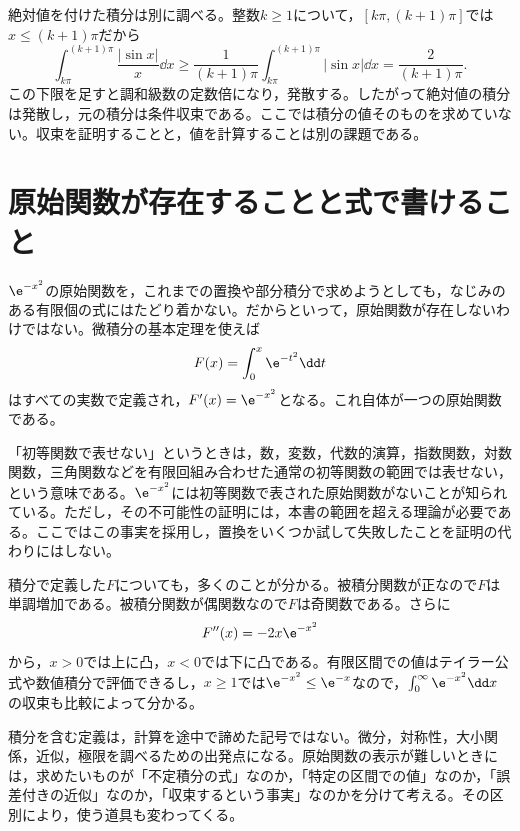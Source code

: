 絶対値を付けた積分は別に調べる。整数$k\geq1$について，$[k\pi,(k+1)\pi]$では$x\leq(k+1)\pi$だから
\[
 \int_{k\pi}^{(k+1)\pi}\frac{|\sin x|}{x}\dd x
 \geq\frac1{(k+1)\pi}\int_{k\pi}^{(k+1)\pi}|\sin x|\dd x
 =\frac2{(k+1)\pi}.
\]
この下限を足すと調和級数の定数倍になり，発散する。したがって絶対値の積分は発散し，元の積分は条件収束である。ここでは積分の値そのものを求めていない。収束を証明することと，値を計算することは別の課題である。

\section{原始関数が存在することと式で書けること}\label{節:非初等原始関数}

$\e^{-x^2}$の原始関数を，これまでの置換や部分積分で求めようとしても，なじみのある有限個の式にはたどり着かない。だからといって，原始関数が存在しないわけではない。微積分の基本定理を使えば
\[
 F(x)=\int_0^x\e^{-t^2}\dd t
\]
はすべての実数で定義され，$F'(x)=\e^{-x^2}$となる。これ自体が一つの原始関数である。

「初等関数で表せない」というときは，数，変数，代数的演算，指数関数，対数関数，三角関数などを有限回組み合わせた通常の初等関数の範囲では表せない，という意味である。$\e^{-x^2}$には初等関数で表された原始関数がないことが知られている。ただし，その不可能性の証明には，本書の範囲を超える理論が必要である。ここではこの事実を採用し，置換をいくつか試して失敗したことを証明の代わりにはしない。

積分で定義した$F$についても，多くのことが分かる。被積分関数が正なので$F$は単調増加である。被積分関数が偶関数なので$F$は奇関数である。さらに
\[
 F''(x)=-2x\e^{-x^2}
\]
から，$x>0$では上に凸，$x<0$では下に凸である。有限区間での値はテイラー公式や数値積分で評価できるし，$x\geq1$では$\e^{-x^2}\leq\e^{-x}$なので，$\int_0^{\infty}\e^{-x^2}\dd x$の収束も比較によって分かる。

積分を含む定義は，計算を途中で諦めた記号ではない。微分，対称性，大小関係，近似，極限を調べるための出発点になる。原始関数の表示が難しいときには，求めたいものが「不定積分の式」なのか，「特定の区間での値」なのか，「誤差付きの近似」なのか，「収束するという事実」なのかを分けて考える。その区別により，使う道具も変わってくる。

